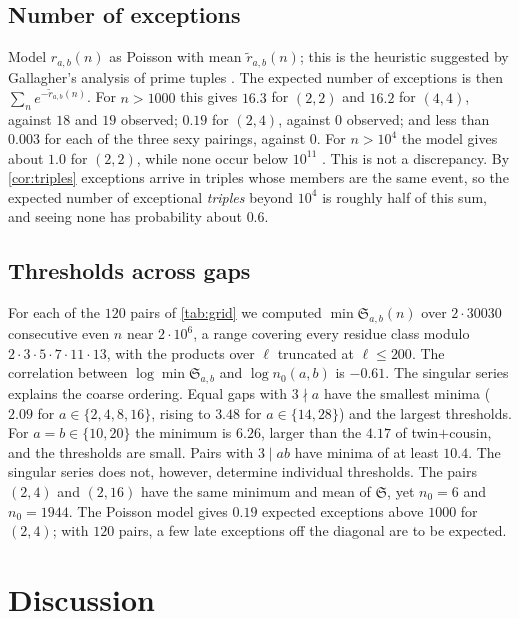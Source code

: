 \documentclass[11pt]{amsart}
\theoremstyle{definition}
\theoremstyle{remark}
\newcommand{\Sg}{\mathfrak{S}}
\begin{document}
\subsection{Number of exceptions}
Model $r_{a,b}(n)$ as Poisson with mean $\widetilde r_{a,b}(n)$; this is the heuristic suggested by Gallagher's analysis of prime tuples \cite{Gallagher1976}. The expected number of exceptions is then $\sum_n e^{-\widetilde r_{a,b}(n)}$. For $n>1000$ this gives $16.3$ for $(2,2)$ and $16.2$ for $(4,4)$, against $18$ and $19$ observed; $0.19$ for $(2,4)$, against $0$ observed; and less than $0.003$ for each of the three sexy pairings, against $0$. For $n>10^4$ the model gives about $1.0$ for $(2,2)$, while none occur below $10^{11}$ \cite{OEIS_A007534}. This is not a discrepancy. By \cref{cor:triples} exceptions arrive in triples whose members are the same event, so the expected number of exceptional \emph{triples} beyond $10^4$ is roughly half of this sum, and seeing none has probability about $0.6$.

\subsection{Thresholds across gaps}
For each of the $120$ pairs of \cref{tab:grid} we computed $\min\Sg_{a,b}(n)$ over $2\cdot 30030$ consecutive even $n$ near $2\cdot10^6$, a range covering every residue class modulo $2\cdot3\cdot5\cdot7\cdot11\cdot13$, with the products over $\ell$ truncated at $\ell\le200$. The correlation between $\log\min\Sg_{a,b}$ and $\log n_0(a,b)$ is $-0.61$. The singular series explains the coarse ordering. Equal gaps with $3\nmid a$ have the smallest minima ($2.09$ for $a\in\{2,4,8,16\}$, rising to $3.48$ for $a\in\{14,28\}$) and the largest thresholds. For $a=b\in\{10,20\}$ the minimum is $6.26$, larger than the $4.17$ of twin$+$cousin, and the thresholds are small. Pairs with $3\mid ab$ have minima of at least $10.4$. The singular series does not, however, determine individual thresholds. The pairs $(2,4)$ and $(2,16)$ have the same minimum and mean of $\Sg$, yet $n_0=6$ and $n_0=1944$. The Poisson model gives $0.19$ expected exceptions above $1000$ for $(2,4)$; with $120$ pairs, a few late exceptions off the diagonal are to be expected.

\section{Discussion}\label{sec:discussion}
\end{document}
